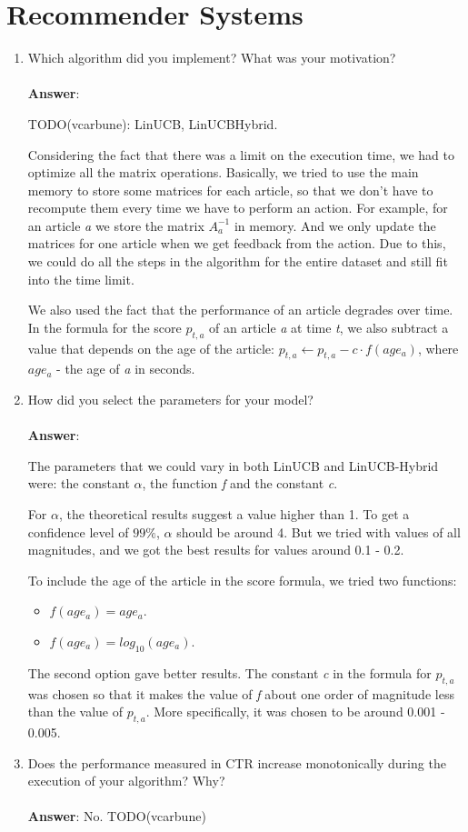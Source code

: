 \documentclass[11pt]{article}
\begin{document}
\section{Recommender Systems}

\begin{enumerate}
\item Which algorithm did you implement? What was your motivation? \\ \\
\textbf{Answer}:

TODO(vcarbune): LinUCB, LinUCBHybrid.


Considering the fact that there was a limit on the execution time, we had to 
optimize all the matrix operations. Basically, we tried to use the main memory to store
some matrices for each article, so that we don't have to recompute them every time we
have to perform an action. For example, for an article \emph{a} we store the matrix
$A_a ^ {-1}$ in memory. And we only update the matrices for one article when we get 
feedback from the action. Due to this, we could do all the steps in the algorithm for
the entire dataset and still fit into the time limit. 

We also used the fact that the performance of an article degrades over time. 
In the formula for the score $p_{t,a}$ of an article \emph{a} at time \emph{t}, we also
subtract a value that depends on the age of the article: 
$p_{t,a} \gets p_{t,a} - c \cdot f(age_a)$, 
where $age_a$ - the age of \emph{a} in seconds.

\item How did you select the parameters for your model? \\ \\
\textbf{Answer}:

The parameters that we could vary in both LinUCB and LinUCB-Hybrid were: 
the constant $\alpha$, the function \emph{f} and the constant \emph{c}.

For $\alpha$, the theoretical results suggest a value higher than 1. To get a confidence
level of $99\%$, $\alpha$ should be around 4. 
But we tried with values of all magnitudes, and we got the best results for values around
0.1 - 0.2.

To include the age of the article in the score formula, we tried two functions: 
\begin{itemize}
    \item $f(age_a) = age_a$.
    \item $f(age_a) = log_{10}(age_a)$.
\end{itemize}

The second option gave better results. The constant \emph{c} in the formula for $p_{t,a}$
was chosen so that it makes the value of \emph{f} about one order of magnitude less than
the value of $p_{t,a}$. More specifically, it was chosen to be around 0.001 - 0.005.

\item Does the performance measured in CTR increase monotonically during the
execution of your algorithm? Why? \\ \\
\textbf{Answer}: No. TODO(vcarbune)

\end{enumerate}
\end{document}
